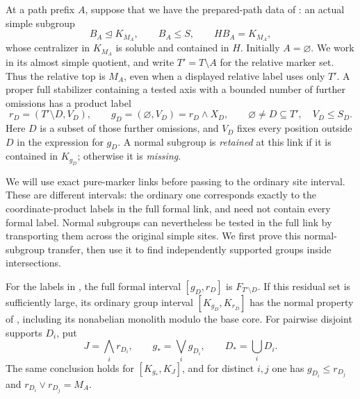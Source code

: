 \begin{convention}\label{fa:relative-labels}
At a path prefix \(A\), suppose that we have the prepared-path data of
: an actual simple subgroup
\[
 B_A\trianglelefteq K_{M_A},\qquad B_A\le S,\qquad HB_A=K_{M_A},
\]
whose centralizer in \(K_{M_A}\) is soluble and contained in \(H\).  Initially \(A=\varnothing\).  We
work in its almost simple quotient, and write \(T'=T\setminus A\) for the relative marker set.  Thus the
relative top is \(M_A\), even when a displayed relative label uses only \(T'\).
A proper full stabilizer containing a tested axis with a bounded number of further omissions has a product label
\begin{equation}\label{fa:witness-labels}
 r_D=(T'\setminus D,V_D),\qquad
 g_D=(\varnothing,V_D)=r_D\wedge X_D,
 \qquad \varnothing\ne D\subseteq T',\quad V_D\le S_D.
\end{equation}
Here \(D\) is a subset of those further omissions, and \(V_D\) fixes every position outside \(D\) in the
expression for \(g_D\).  A normal subgroup is \emph{retained} at this link if it is contained in
\(K_{g_D}\); otherwise it is \emph{missing}.
\end{convention}

We will use exact pure-marker links before passing to the ordinary site
interval.  These are different intervals: the ordinary one corresponds
exactly to the coordinate-product labels in the full formal link, and
need not contain every formal label.  Normal subgroups can nevertheless
be tested in the full link by transporting them across the original
simple sites.  We first prove this normal-subgroup transfer, then use
it to find independently supported groups inside intersections.

\begin{lemma}\label{fa:pure-links}
For the labels in , the full formal interval \([g_D,r_D]\) is \(F_{T'\setminus
D}\).  If this residual set is sufficiently large, its ordinary group interval \([K_{g_D},K_{r_D}]\) has
the normal property of , including its nonabelian monolith modulo the base core.
For pairwise disjoint supports \(D_i\), put
\[
 J=\bigwedge_i r_{D_i},\qquad g_* =\bigvee_i g_{D_i},\qquad D_* =\bigcup_i D_i.
\]
The same conclusion holds for \([K_{g_*},K_J]\), and for distinct \(i,j\) one has \(g_{D_i}\le r_{D_j}\)
and \(r_{D_i}\vee r_{D_j}=M_A\).
\end{lemma}

